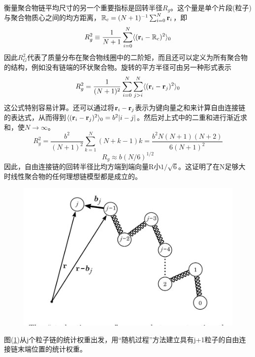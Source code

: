 衡量聚合物链平均尺寸的另一个重要指标是回转半径$R_{g}$。这个量是单个片段(粒子)与聚合物质心之间的均方距离，$\mathbb{R}_{c}=(N+1)^{-1} \sum _{i=0}^{N} \mathbf{r}_{i}$，即\\
\begin{equation}
R_{g}^2 \equiv \frac{1}{N+1} \sum _{i=0}^{N} \langle (\mathbf{r}_{i}- \mathbb{R}_{c})^2 \rangle_{0} 
\label{2.14}
\end{equation}
因此$R_{G}^2$代表了质量分布在聚合物线圈中的二阶矩，而且还可以定义为所有聚合物的结构，例如没有链端的环状聚合物。旋转的平方半径可由另一种形式表示\\
\begin{equation}
R_{g}^2=\frac{1}{(N+1)^2} \sum _{i=0}^{N} \sum _{j>i}^{N} \langle (\mathbf{r}_{i}- \mathbf{r}_{j})^2 \rangle_{0} 
\label{2.15}
\end{equation}
这公式特别容易计算。还可以通过将$\mathbf{r}_{i}-\mathbf{r}_{j}$表示为键向量之和来计算自由连接链的表达式，从而得到$\langle (\mathbf{r}_{i}- \mathbf{r}_{j})^2 \rangle_{0}=b^2 |i-j|$。然后对上式中的二重和进行渐近求和，使$N \rightarrow \infty $。\\
\begin{equation}
R_{g}^{2} = \frac{b^2}{(N+1)^2} \sum _{k=1} ^{N} (N+k-1)k=\frac{b^2 N(N+1)(N+2)}{6(N+1)^2}
\end{equation}
\begin{equation}
R_{g}\approx b(N/6)^{1/2}
\label{2.16}
\end{equation}
因此，自由连接链的回转半径比均方端到端向量R小$1/\sqrt{6}$。这证明了在N足够大时线性聚合物的任何理想链模型都是成立的。\\
\begin{figure}[H]
	\centering   
	\includegraphics[width=12cm]{Contents/chapter2/figures/3.png}
	\caption{ }
	\label{2.2}
\end{figure}
图(\ref{2.2})从j个粒子链的统计权重出发，用“随机过程”方法建立具有j+1粒子的自由连接链末端位置的统计权重。\\

